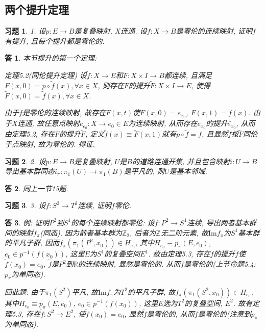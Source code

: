 \documentclass{ctexart}%
\newtheorem*{exercise}{习题}
\newtheorem*{solution}{答}
\theoremstyle{definition}
\theoremstyle{remark}
\begin{document}
\subsection{两个提升定理}

\begin{exercise}1. 设$p: E\rightarrow B$是复叠映射, $X$连通. 设$f:X\rightarrow B$是零伦的连续映射, 证明$f$有提升, 且每个提升都是零伦的.
\end{exercise}
\begin{solution}
本节提升的第一个定理: 

定理5.2(同伦提升定理) 设$\tilde{f}:X\rightarrow E$和$F:X\times I\rightarrow B$都连续, 且满足$F(x,0)=p\circ \tilde{f}(x),\forall x\in X$, 则存在$F$的提升$\tilde{F}:X\times I\rightarrow E$, 使得$\tilde{F}(x,0)=\tilde{f}(x), \forall x\in X$.

由于$f$是零伦的连续映射, 故存在$F(x,t)$使$F(x,0)=e_{x_0}$, $F(x,1)=f(x)$. 由于$X$连通, 故任意点映射$e_{e_0}: X\rightarrow e_0\in E$为连续映射, 从而存在$e_{x_0}$的提升$\tilde{e_{x_0}}$, 从而由定理5.2, 存在$F$的提升$\tilde{F}$, 定义$\tilde{f}(x)\equiv\tilde{F}(x,1)$就有$p\circ \tilde{f}=f$, 且显然$\tilde{f}$按$\tilde{F}$同伦于点映射, 故为零伦的. 得证.
\end{solution}

\begin{exercise}2. 设$p:E\rightarrow B$是复叠映射, $U$是$B$的道路连通开集, 并且包含映射$i:U\rightarrow B$导出基本群同态$i_\pi: \pi_1(U)\rightarrow \pi_1(B)$是平凡的, 则$U$是基本邻域.
\end{exercise}
\begin{solution}
同上一节15题. 
\end{solution}

\begin{exercise}3. 设$f:S^2\rightarrow T^2$连续, 证明$f$零伦.
\end{exercise}
\begin{solution}
例: 证明$P^2$到$S^1$的每个连续映射都零伦: 设$f:P^2\rightarrow S^1$连续, 导出两者基本群间的映射$f_\pi$(同态). 因为前者基本群为$\mathbb{Z}_2$, 后者为$\mathbb{Z}$无二阶元素, 故$\text{Im} f_\pi$为$S^1$基本群的平凡子群, 因而$f_\pi(\pi_1(P^2,x_0))\in H_{e_0}$, 其中$H_{e_0}\equiv p_\pi(E,e_0)$, $e_0\in p^{-1}(f(x_0))$, 这里$E$为$S^1$的复叠空间$E^1$. 故由定理5.3, 存在$f$的提升$\tilde{f}$使$\tilde{f}(x_0)=e_0$, $\tilde{f}$是$P^2$到$\mathbb{R}$的连续映射, 显然是零伦的. 从而$f$是零伦的(上节命题5.4: $p_\pi$为单同态).

回此题: 由于$\pi_1(S^2)$平凡, 故$\text{Im}f_\pi$为$T^2$的平凡子群, 故$f_\pi(\pi_1(S^2,x_0)) \in H_{e_0}$, 其中$H_{e_0}\equiv p_\pi(E,e_0)$, $e_0 \in p^{-1}(f(x_0))$, 这里$E$选为$T^2$的复叠空间, $E^2$. 故有定理5.3, 存在$\tilde{f}:S^2\rightarrow E^2$, 使$\tilde{f}(x_0)=e_0$, 显然$\tilde{f}$是零伦的, 从而$f$是零伦的(注意到$p_\pi$为单同态). 
\end{solution}
\end{document}
